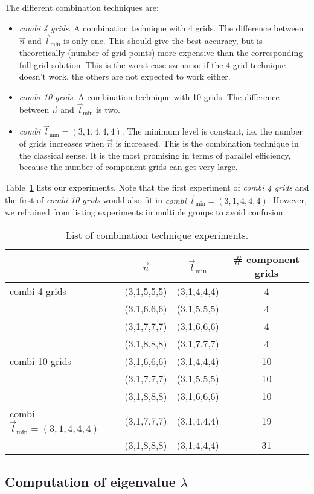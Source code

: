 \documentclass{scrartcl}
\newcommand{\lmin}{\vec{l}_{\text{min}}}
\begin{document}
The different combination techniques are:
\begin{itemize}
\item \textit{combi 4 grids}. A combination technique with 4 grids. The difference between $\vec n$ and $\lmin$ is only one. This should give the best accuracy, but is theoretically (number of grid points) more expensive than the corresponding full grid solution. This is the worst case szenario: if the 4 grid technique doesn't work, the others are not expected to work either.
\item \textit{combi 10 grids}. A combination technique with 10 grids. The difference between $\vec n$ and $\lmin$ is two. 
\item \textit{combi $\lmin = (3,1,4,4,4)$}. The minimum level is constant, i.e. the number of grids increases when $\vec n$ is increased. This is the combination technique in the classical sense. It is the most promising in terms of parallel efficiency, because the number of component grids can get very large.   
\end{itemize}
Table~\ref{tab:list_experiments} lists our experiments. Note that the first experiment of \textit{combi 4 grids} and the first of \textit{combi 10 grids} would also fit in \textit{combi $\lmin = (3,1,4,4,4)$}. However, we refrained from listing experiments in multiple groups to avoid confusion.

\begin{table}[h]
\caption{List of combination technique experiments.}
\centering
\begin{tabular}{l|c|c|c}
 & $\vec{n}$ & $\lmin$ & \# component grids\\
\hline
combi 4 grids & (3,1,5,5,5) & (3,1,4,4,4) & 4 \\
 & (3,1,6,6,6) & (3,1,5,5,5) & 4 \\
 & (3,1,7,7,7) & (3,1,6,6,6) & 4 \\
 & (3,1,8,8,8) & (3,1,7,7,7) & 4 \\
 \hline
combi 10 grids & (3,1,6,6,6) & (3,1,4,4,4) & 10 \\
  & (3,1,7,7,7) & (3,1,5,5,5) & 10 \\
  & (3,1,8,8,8) & (3,1,6,6,6) & 10 \\
 \hline
combi $\lmin = (3,1,4,4,4)$ & (3,1,7,7,7) & (3,1,4,4,4) & 19 \\
 & (3,1,8,8,8) & (3,1,4,4,4) & 31
\end{tabular}
\label{tab:list_experiments}
\end{table}

\subsection*{Computation of eigenvalue $\lambda$}
\end{document}
